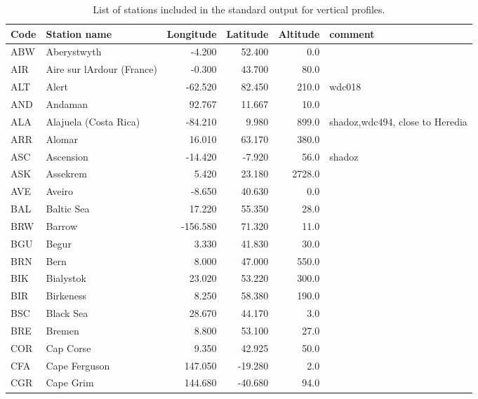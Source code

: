 \begin{table*}[!th]
  \caption{List of stations included in the standard output for
    vertical profiles.}\label{table:vprofseries}
  \tiny
  \begin{tabular}{llrrrl}
Code & Station name               & Longitude& Latitude & Altitude  & comment\\
\hline
ABW & Aberystwyth                 &     -4.200 &  52.400 &     0.0 &\\
AIR & Aire sur lArdour (France)   &     -0.300 &  43.700 &    80.0 &\\
ALT & Alert                       &    -62.520 &  82.450 &   210.0 & wdc018\\
AND & Andaman                     &     92.767 &  11.667 &    10.0 &\\
ALA & Alajuela (Costa Rica)
       &    -84.210 &   9.980 &   899.0 & shadoz,wdc494, close to Heredia\\
ARR & Alomar                      &     16.010 &  63.170 &   380.0 &\\
ASC & Ascension                   &    -14.420 &  -7.920 &    56.0 & shadoz \\
ASK & Assekrem                    &      5.420 &  23.180 &  2728.0 &\\
AVE & Aveiro                      &     -8.650 &  40.630 &     0.0 &\\
BAL & Baltic Sea                  &     17.220 &  55.350 &    28.0 &\\
BRW & Barrow                      &   -156.580 &  71.320 &    11.0 &\\
BGU & Begur                       &      3.330 &  41.830 &    30.0 &\\
BRN & Bern                        &      8.000 &  47.000 &   550.0 &\\
BIK & Bialystok                   &     23.020 &  53.220 &   300.0 &\\
BIR & Birkeness                   &      8.250 &  58.380 &   190.0 &\\
BSC & Black Sea                   &     28.670 &  44.170 &     3.0 &\\
BRE & Bremen                      &      8.800 &  53.100 &    27.0 &\\  
COR & Cap Corse                   &      9.350 &  42.925 &    50.0 &\\
CFA & Cape Ferguson               &    147.050 & -19.280 &     2.0 &\\
CGR & Cape Grim                   &    144.680 & -40.680 &    94.0 &\\

\end{tabular}
\end{table*}
